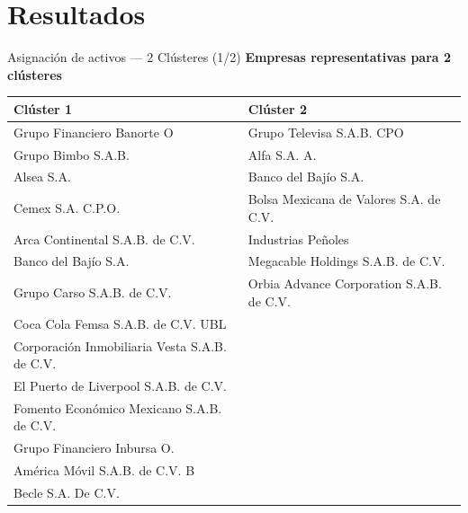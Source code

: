 \documentclass[aspectratio=169,xcolor=dvipsnames]{beamer}
\begin{document}
\section{Resultados}
\begin{frame}{Asignación de activos — 2 Clústeres (1/2)}
    \small
    \textbf{Empresas representativas para 2 clústeres}

    \vspace{0.8em}

    \begin{tabularx}{\textwidth}{@{}X X@{}}
    \toprule
    \textbf{Clúster 1} & \textbf{Clúster 2} \\
    \midrule
    Grupo Financiero Banorte O & Grupo Televisa S.A.B. CPO\\  
    Grupo Bimbo S.A.B. & Alfa S.A. A. \\
    Alsea S.A. & Banco del Bajío S.A. \\
    Cemex S.A. C.P.O. & Bolsa Mexicana de Valores S.A. de C.V. \\
    Arca Continental S.A.B. de C.V. & Industrias Peñoles \\
    Banco del Bajío S.A. & Megacable Holdings S.A.B. de C.V.\\
    Grupo Carso S.A.B. de C.V. & Orbia Advance Corporation S.A.B. de C.V.  \\
    Coca Cola Femsa S.A.B. de C.V. UBL & \\
    Corporación Inmobiliaria Vesta S.A.B. de C.V. & \\
    El Puerto de Liverpool S.A.B. de C.V. & \\
    Fomento Económico Mexicano S.A.B. de C.V. & \\
    Grupo Financiero Inbursa O. & \\
    América Móvil S.A.B. de C.V. B &  \\
    Becle S.A. De C.V. & \\
    \bottomrule
    \end{tabularx}
\end{frame}
\end{document}
